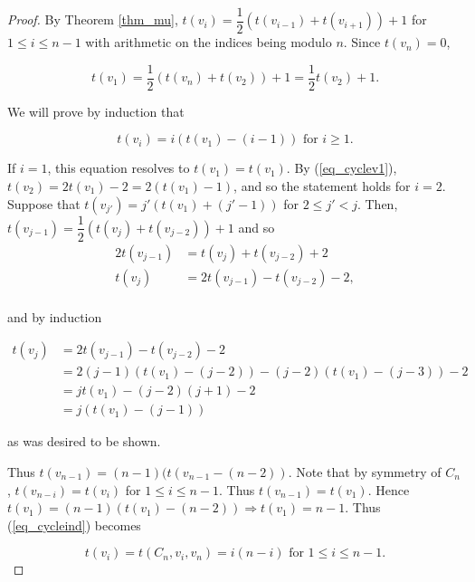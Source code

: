 \documentclass{article}
\theoremstyle{definition}
\begin{document}
\begin{proof}
\noindent By Theorem \ref{thm_mu}, $t(v_i) = \dfrac{1}{2}(t(v_{i-1}) + t(v_{i+1})) + 1$ for $1 \leq i \leq n-1$ with arithmetic on the indices being modulo $n$. Since $t(v_n) = 0$,

\begin{equation}\label{eq_cyclev1} t(v_1) = \dfrac{1}{2}(t(v_{n}) + t(v_{2})) + 1 = \dfrac{1}{2}t(v_2) + 1. \end{equation} 

\par We will prove by induction that

\begin{equation}\label{eq_cycleind} t(v_i) = i(t(v_1)-(i-1)) \text{ for } i \geq 1. \end{equation}

If $i = 1$, this equation resolves to $t(v_1) = t(v_1)$. By (\ref{eq_cyclev1}), $t(v_2) = 2t(v_1) - 2 = 2(t(v_1)-1)$, and so the statement holds for $i = 2$. Suppose that $t(v_{j'}) = j'(t(v_1) + (j'-1))$ for $2 \leq j' < j$. Then, $t(v_{j-1})  =  \dfrac{1}{2}(t(v_{j}) + t(v_{j-2})) + 1$ and so 
    \begin{align*}
      2t(v_{j-1}) & =  t(v_j) + t(v_{j-2}) + 2 \\
     t(v_j) & = 2t(v_{j-1}) - t(v_{j-2}) - 2, \\  
\end{align*}

and by induction

\begin{align*}
    t(v_j) & = 2t(v_{j-1}) - t(v_{j-2}) - 2 \\
     & = 2(j-1)(t(v_1) - (j-2)) - (j-2)(t(v_1) - (j-3)) - 2 \\
     & = jt(v_1) - (j-2)(j+1) - 2 \\
     & = j(t(v_1) - (j-1) )
\end{align*}

\noindent as was desired to be shown.

\par Thus $t(v_{n-1}) = (n-1)(t(v_{n-1} - (n-2))$. Note that by symmetry of $C_n$, $t(v_{n-i}) = t(v_i)$ for $1 \leq i \leq n-1$. Thus $t(v_{n-1}) = t(v_1)$. Hence $t(v_1) = (n-1)(t(v_1)-(n-2)) \Rightarrow t(v_1) = n-1$. Thus (\ref{eq_cycleind}) becomes 

\[t(v_i)=t(C_n,v_i,v_n) = i(n-i) \text{ for } 1 \leq i \leq n-1.\]
    
\end{proof}
\end{document}
